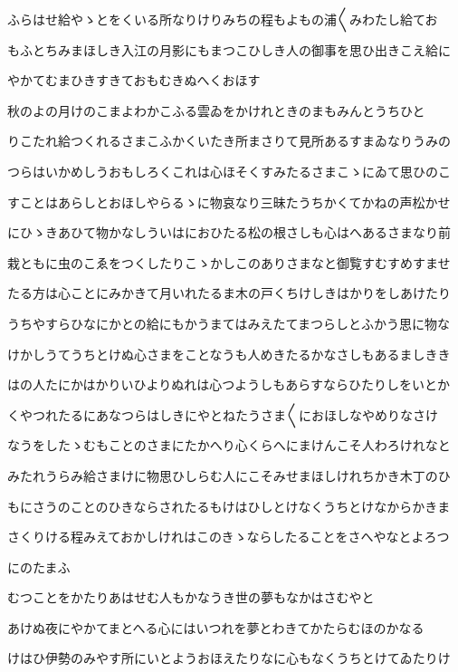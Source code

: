 \documentclass[a4paper,11pt,landscape]{ltjtarticle}
\begin{document}
ふらはせ給やゝとをくいる所なりけりみちの程もよもの浦〱みわたし給てお
\par\medskip
もふとちみまほしき入江の月影にもまつこひしき人の御事を思ひ出きこえ給に
\par\medskip
やかてむまひきすきておもむきぬへくおほす
\par\medskip
秋のよの月けのこまよわかこふる雲ゐをかけれときのまもみんとうちひと
\par\medskip
りこたれ給つくれるさまこふかくいたき所まさりて見所あるすまゐなりうみの
\par\medskip
つらはいかめしうおもしろくこれは心ほそくすみたるさまこゝにゐて思ひのこ
\par\medskip
すことはあらしとおほしやらるゝに物哀なり三昧たうちかくてかねの声松かせ
\par\medskip
にひゝきあひて物かなしういはにおひたる松の根さしも心はへあるさまなり前
\par\medskip
栽ともに虫のこゑをつくしたりこゝかしこのありさまなと御覧すむすめすませ
\par\medskip
たる方は心ことにみかきて月いれたるま木の戸くちけしきはかりをしあけたり
\par\medskip
うちやすらひなにかとの給にもかうまてはみえたてまつらしとふかう思に物な
\par\medskip
けかしうてうちとけぬ心さまをことなうも人めきたるかなさしもあるましきき
\par\medskip
はの人たにかはかりいひよりぬれは心つようしもあらすならひたりしをいとか
\par\medskip
くやつれたるにあなつらはしきにやとねたうさま〱におほしなやめりなさけ
\par\medskip
なうをしたゝむもことのさまにたかへり心くらへにまけんこそ人わろけれなと
\par\medskip
みたれうらみ給さまけに物思ひしらむ人にこそみせまほしけれちかき木丁のひ
\par\medskip
もにさうのことのひきならされたるもけはひしとけなくうちとけなからかきま
\par\medskip
さくりける程みえておかしけれはこのきゝならしたることをさへやなとよろつ
\par\medskip
にのたまふ
\par\medskip
むつことをかたりあはせむ人もかなうき世の夢もなかはさむやと
\par\medskip
あけぬ夜にやかてまとへる心にはいつれを夢とわきてかたらむほのかなる
\par\medskip
けはひ伊勢のみやす所にいとようおほえたりなに心もなくうちとけてゐたりけ
\par\medskip
\end{document}
